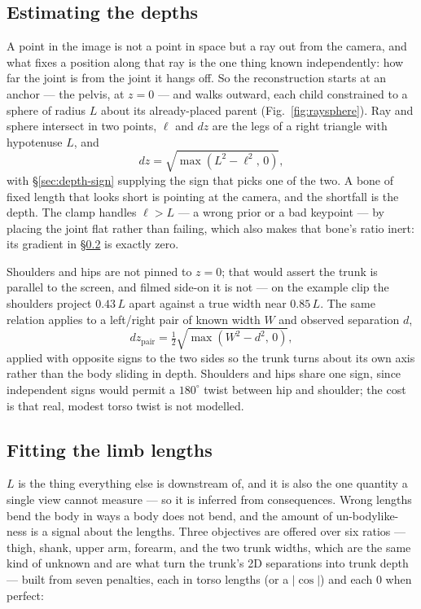 \documentclass[10pt,a4paper]{article}
\newcommand{\Lt}{L}                      %
\begin{document}
\subsection{Estimating the depths}\label{sec:depth-lift}

A point in the image is not a point in space but a ray out from the camera, and
what fixes a position along that ray is the one thing known independently: how
far the joint is from the joint it hangs off. So the reconstruction starts at
an anchor --- the pelvis, at $z=0$ --- and walks outward, each child constrained
to a sphere of radius $L$ about its already-placed parent
(Fig.~\ref{fig:raysphere}). Ray and sphere intersect in two points, $\ell$ and
$dz$ are the legs of a right triangle with hypotenuse $L$, and
\[
  dz=\sqrt{\max(L^2-\ell^2,\,0)},
\]
with \S\ref{sec:depth-sign} supplying the sign that picks one of the two. A
bone of fixed length that looks short is pointing at the camera, and the
shortfall is the depth. The clamp handles $\ell>L$ --- a wrong prior or a bad
keypoint --- by placing the joint flat rather than failing, which also makes
that bone's ratio inert: its gradient in \S\ref{sec:depth-limbs} is exactly
zero.

Shoulders and hips are not pinned to $z=0$; that would assert the trunk is
parallel to the screen, and filmed side-on it is not --- on the example clip
the shoulders project $0.43\,\Lt$ apart against a true width near $0.85\,\Lt$.
The same relation applies to a left/right pair of known width $W$ and observed
separation $d$,
\[
  dz_{\text{pair}}=\tfrac{1}{2}\sqrt{\max(W^2-d^2,\,0)},
\]
applied with opposite signs to the two sides so the trunk turns about its own
axis rather than the body sliding in depth. Shoulders and hips share one sign,
since independent signs would permit a $180^\circ$ twist between hip and
shoulder; the cost is that real, modest torso twist is not modelled.

\subsection{Fitting the limb lengths}\label{sec:depth-limbs}

$L$ is the thing everything else is downstream of, and it is also the one
quantity a single view cannot measure --- so it is inferred from consequences.
Wrong lengths bend the body in ways a body does not bend, and the amount of
un-bodylike-ness is a signal about the lengths. Three objectives are offered
over six ratios --- thigh, shank, upper arm, forearm, and the two trunk widths,
which are the same kind of unknown and are what turn the trunk's 2D separations
into trunk depth --- built from seven penalties, each in torso lengths (or a
$|\cos|$) and each $0$ when perfect:
\end{document}
